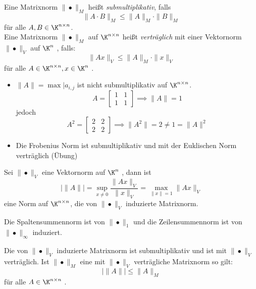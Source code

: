 \begin{definition}
Eine Matrixnorm $\|•\|_M$ heißt \emph{submultiplikativ}, falls 
\[
\|A\cdot B\|_M \le \|A\|_M \cdot \|B\|_M
\]
für alle $A,B \in \K^{n\times n}$.\\
Eine Matrixnorm $\|•\|_M$ auf $\K^{n\times n}$ heißt \emph{verträglich} mit einer Vektornorm $\|•\|_V$  auf $\K^{n}$ , falls:
\[
\|Ax\|_V \le \|A\|_M \cdot \|x\|_V
\]
für alle $A \in \K^{n\times n}, x \in \K^{n}$ .
\end{definition}
\begin{example}
\begin{itemize}
	\item $\|A\|= \max |a_{i,j}$ ist nicht submultiplikativ auf $\K^{n\times n}$.
		\[
		A = \begin{bmatrix}
		 1 & 1 \\ 1 & 1
		\end{bmatrix} \implies \|A\|=1
		\]
		jedoch 
		\[
		A^2= \begin{bmatrix}
			2 & 2 \\ 2 & 2
		\end{bmatrix} \implies \|A^2\|=2 \neq 1 = \|A\|^2
		\]
	\item Die Frobenius Norm ist submultiplikativ und mit der Euklischen Norm verträglich (Übung)
\end{itemize}
\end{example}
\begin{definition}
Sei $\|•\|_V $ eine Vektornorm auf $\K^{n}$ , dann ist 
\[
|\|A\|| = \sup_{x\neq 0} \frac{\|Ax\|_V}{\|x\|_V}= \max_{\|x\| = 1} \|Ax\|_V
\]
eine Norm auf $\K^{n\times n}$, die von  $\|•\|_V$ induzierte Matrixnorm. 
\end{definition}
\begin{example}
Die Spaltensummennorm ist von $\|•\|_1$ und die Zeilensummennorm ist von $\|•\|_{\infty}$ induziert.
\end{example}
\begin{lemma}
	Die von $\|•\|_V$ induzierte Matrixnorm ist submultiplikativ und ist mit $\|•\|_V$ verträglich. Ist $\|•\|_M$ eine mit $\|•\|_V$ verträgliche Matrixnorm so gilt:
	\[
	|\|A\|| \le \|A\|_M
	\]
	für alle $A \in \K^{n\times n}$ .
\end{lemma}
